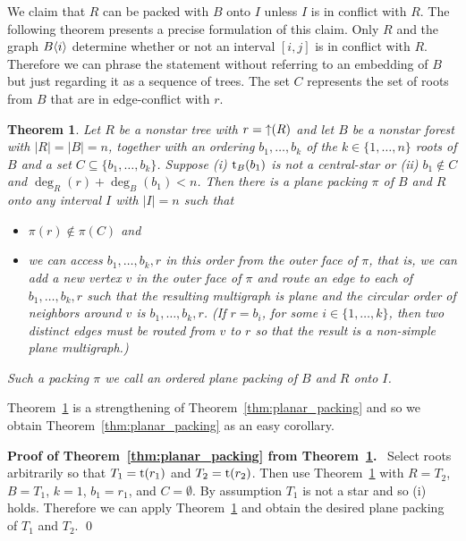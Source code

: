\documentclass[11pt,a4paper,colorlinks=true,urlcolor=blue,citecolor=red]{article}
\theoremstyle{plain}
\newtheorem{theorem}{Theorem}
\newenvironment{proofof}[1]{\par\medskip\noindent\textbf{\sffamily Proof of #1.}~}{\qed\par\medskip}
\begin{document}
We claim that $R$ can be packed with $B$ onto $I$ unless $I$ is in
conflict with $R$. The following theorem presents a precise formulation
of this claim. Only $R$ and the graph $B\langle{i}\rangle$ determine whether or
not an interval $[i,j]$ is in conflict with $R$. Therefore we can phrase
the statement without referring to an embedding of $B$ but just
regarding it as a sequence of trees. The set $C$ represents the set of
roots from $B$ that are in edge-conflict with $r$.
\begin{theorem}\label{thm:main}
  Let $R$ be a nonstar tree with $r=\mathop{\uparrow}(R)$ and let $B$ be a nonstar
  forest with $|R|=|B|=n$, together with an ordering $b_1,\ldots,b_k$ of
  the $k\in\{1,\ldots,n\}$ roots of $B$ and a set
  $C\subseteq\{b_1,\ldots,b_k\}$. Suppose (i) $\mathrm t_B(b_1)$ is not a central-star or (ii) $b_1\notin C$ and
  $\deg_R(r)+\deg_B(b_1)<n$. Then there is a plane packing $\pi$ of $B$
  and $R$ onto any interval $I$ with $|I|=n$ such that
\begin{itemize}
  \item $\pi(r)\notin\pi(C)$ and
  \item we can access $b_1,\ldots,b_k,r$ in this order from the outer
    face of $\pi$, that is, we can add a new vertex $v$ in the outer
    face of $\pi$ and route an edge to each of $b_1,\ldots,b_k,r$ such
    that the resulting multigraph is plane and the circular order of
    neighbors around $v$ is $b_1,\ldots,b_k,r$. (If $r=b_i$, for some
    $i\in\{1,\ldots,k\}$, then two distinct edges must be routed from
    $v$ to $r$ so that the result is a non-simple plane multigraph.)
  \end{itemize}
  Such a packing $\pi$ we call an \emph{ordered plane packing} of $B$
  and $R$ onto $I$.
\end{theorem}

\noindent
Theorem~\ref{thm:main} is a strengthening of
Theorem~\ref{thm:planar_packing} and so we obtain
Theorem~\ref{thm:planar_packing} as an easy corollary.
\begin{proofof}{Theorem~\ref{thm:planar_packing} from
    Theorem~\ref{thm:main}}
  Select roots arbitrarily so that $T_1=\mathrm t(r_1)$ and $T_2=\mathrm t(r_2)$.
Then use Theorem~\ref{thm:main} with $R=T_2$, $B=T_1$, $k=1$,
  $b_1=r_1$, and $C=\emptyset$. By assumption $T_1$ is not a star and so
  (i) holds. Therefore we can apply Theorem~\ref{thm:main} and obtain
  the desired plane packing of $T_1$ and $T_2$.
\end{proofof}
\end{document}
